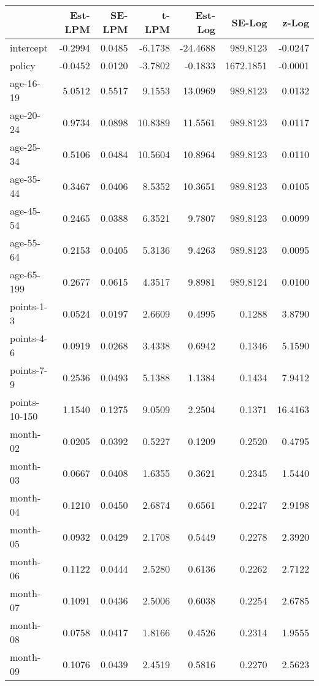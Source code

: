 \documentclass[10pt]{article}
\begin{document}
\begin{table}[ht]
\centering
\begin{tabular}{lrrrrrr}
  \hline
 & Est-LPM & SE-LPM & t-LPM & Est-Log & SE-Log & z-Log \\ 
  \hline
intercept & -0.2994 & 0.0485 & -6.1738 & -24.4688 & 989.8123 & -0.0247 \\ 
  policy & -0.0452 & 0.0120 & -3.7802 & -0.1833 & 1672.1851 & -0.0001 \\ 
  age-16-19 & 5.0512 & 0.5517 & 9.1553 & 13.0969 & 989.8123 & 0.0132 \\ 
  age-20-24 & 0.9734 & 0.0898 & 10.8389 & 11.5561 & 989.8123 & 0.0117 \\ 
  age-25-34 & 0.5106 & 0.0484 & 10.5604 & 10.8964 & 989.8123 & 0.0110 \\ 
  age-35-44 & 0.3467 & 0.0406 & 8.5352 & 10.3651 & 989.8123 & 0.0105 \\ 
  age-45-54 & 0.2465 & 0.0388 & 6.3521 & 9.7807 & 989.8123 & 0.0099 \\ 
  age-55-64 & 0.2153 & 0.0405 & 5.3136 & 9.4263 & 989.8123 & 0.0095 \\ 
  age-65-199 & 0.2677 & 0.0615 & 4.3517 & 9.8981 & 989.8124 & 0.0100 \\ 
  points-1-3 & 0.0524 & 0.0197 & 2.6609 & 0.4995 & 0.1288 & 3.8790 \\ 
  points-4-6 & 0.0919 & 0.0268 & 3.4338 & 0.6942 & 0.1346 & 5.1590 \\ 
  points-7-9 & 0.2536 & 0.0493 & 5.1388 & 1.1384 & 0.1434 & 7.9412 \\ 
  points-10-150 & 1.1540 & 0.1275 & 9.0509 & 2.2504 & 0.1371 & 16.4163 \\ 
  month-02 & 0.0205 & 0.0392 & 0.5227 & 0.1209 & 0.2520 & 0.4795 \\ 
  month-03 & 0.0667 & 0.0408 & 1.6355 & 0.3621 & 0.2345 & 1.5440 \\ 
  month-04 & 0.1210 & 0.0450 & 2.6874 & 0.6561 & 0.2247 & 2.9198 \\ 
  month-05 & 0.0932 & 0.0429 & 2.1708 & 0.5449 & 0.2278 & 2.3920 \\ 
  month-06 & 0.1122 & 0.0444 & 2.5280 & 0.6136 & 0.2262 & 2.7122 \\ 
  month-07 & 0.1091 & 0.0436 & 2.5006 & 0.6038 & 0.2254 & 2.6785 \\ 
  month-08 & 0.0758 & 0.0417 & 1.8166 & 0.4526 & 0.2314 & 1.9555 \\ 
  month-09 & 0.1076 & 0.0439 & 2.4519 & 0.5816 & 0.2270 & 2.5623 \\ 

\end{tabular}
\end{table}
\end{document}
